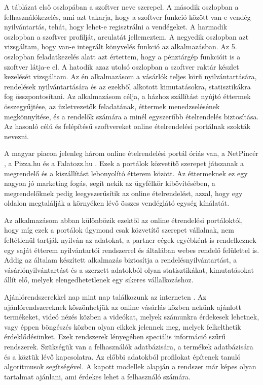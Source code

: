 A táblázat első oszlopában a szoftver neve szerepel. A második oszlopban a felhasználókezelés, ami azt takarja, hogy a szoftver funkció között van-e vendég nyilvántartás, tehát, hogy lehet-e regisztrálni a vendégeket. A harmadik oszlopban a szoftver profilját, arculatát jellemeztem. A negyedik oszlopban azt vizsgáltam, hogy van-e integrált könyvelés funkció az alkalmazásban. Az 5. oszlopban feladatkezelés alatt azt értettem, hogy a pénztárgép funkcióit is a szoftver látja-e el. A hatodik azaz utolsó oszlopban a szoftver raktár készlet kezelését vizsgáltam. Az én alkalmazásom a vásárlók teljes körű nyilvántartására, rendelések nyilvántartására és az ezekből alkotott kimutatásokra, statisztikákra fog összpontosítani. Az alkalmazásom célja, a házhoz szállítást nyújtó éttermek összegyűjtése, az üzletvezetők feladatának, éttermek menedzselésének megkönnyítése, és a rendelők számára a minél egyszerűbb ételrendelés biztosítása. Az hasonló célú és felépítésű szoftvereket online ételrendelési portálnak szokták nevezni.

A magyar piacon jelenleg három online ételrendelési portál óriás van, a NetPincér \cite{netpincer.hu}, a Pizza.hu \cite{pizza.hu} és a Falatozz.hu \cite{falatozz.hu}. Ezek a portálok közvetítő szerepet játszanak a megrendelő és a kiszállítást lebonyolító étterem között. Az éttermeknek ez egy nagyon jó marketing fogás, segít nekik az ügyfélkör kibővítésében, a megrendelőknek pedig leegyszerűsítik az online ételrendelést, azzal, hogy egy oldalon megtalálják a környéken lévő összes vendéglátó egység kínálatát.

Az alkalmazásom abban különbözik ezektől az online étrendelési portáloktól, hogy míg ezek a portálok úgymond csak közvetítő szerepet vállalnak, nem feltétlenül tartják nyilván az adatokat, a partner cégek egyébként is rendelkeznek egy saját étterem nyilvántartói rendszerrel és általában webes rendelő felülettel is. Addig az általam készített alkalmazás biztosítja a rendelésnyilvántartást, a vásárlónyilvántartást és a szerzett adatokból olyan statisztikákat, kimutatásokat állít elő, melyek elengedhetetlenek egy sikeres vállalkozáshoz.


Ajánlórendszerekkel nap mint nap találkozunk az interneten \cite{recommender_system}. Az ajánlórendszereknek köszönhetjük az online vásárlás közben nekünk ajánlott termékeket, videó nézés közben a videókat, melyek számunkra érdekesek lehetnek, vagy éppen böngészés közben olyan cikkek jelennek meg, melyek felkelthetik érdeklődésünket. Ezek rendszerek lényegében speciális információ szűrű rendszerek. Szükségük van a felhasználók adatbázisára, a termékek adatbázisára és a köztük lévő kapcsolatra. Az előbbi adatokból profilokat építenek tanuló algoritmusok segítségével. A kapott modellek alapján a rendszer már képes olyan tartalmat ajánlani, ami érdekes lehet a felhasználó számára.

